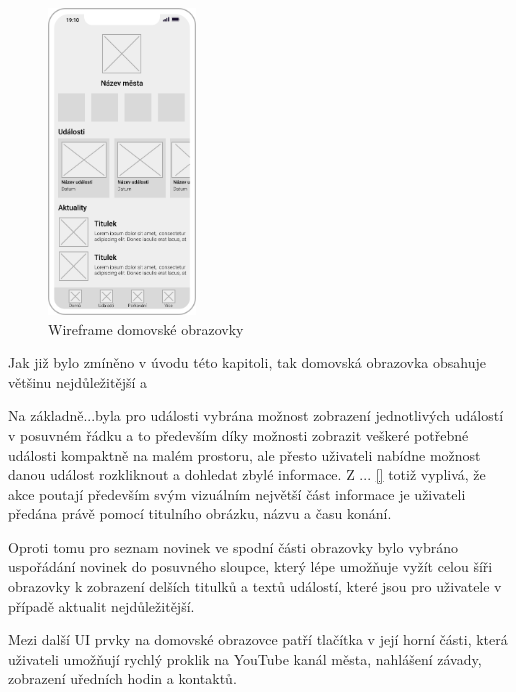 \begin{figure}
  \centering
  \includegraphics[width=0.35\textwidth]{home_wireframe.png}
  \caption{Wireframe domovské obrazovky}
\end{figure}

Jak již bylo zmíněno v úvodu této kapitoli, tak domovská obrazovka obsahuje většinu nejdůležitější a 

Na základně...byla pro události vybrána možnost zobrazení jednotlivých událostí v posuvném řádku a to především díky možnosti zobrazit
veškeré potřebné události kompaktně na malém prostoru, ale přesto uživateli nabídne možnost danou událost rozkliknout a dohledat zbylé informace.
Z ... \ref{} totiž vyplivá, že akce poutají především svým vizuálním největší část informace je uživateli předána právě pomocí titulního obrázku, názvu
a času konání.

Oproti tomu pro seznam novinek ve spodní části obrazovky bylo vybráno uspořádání novinek do posuvného sloupce, který lépe umožňuje 
vyžít celou šíři obrazovky k zobrazení delších titulků a textů událostí, které jsou pro uživatele v případě aktualit nejdůležitější.

Mezi další UI prvky na domovské obrazovce patří tlačítka v její horní části, která uživateli umožňují rychlý proklik na YouTube kanál města,
nahlášení závady, zobrazení uředních hodin a kontaktů.



